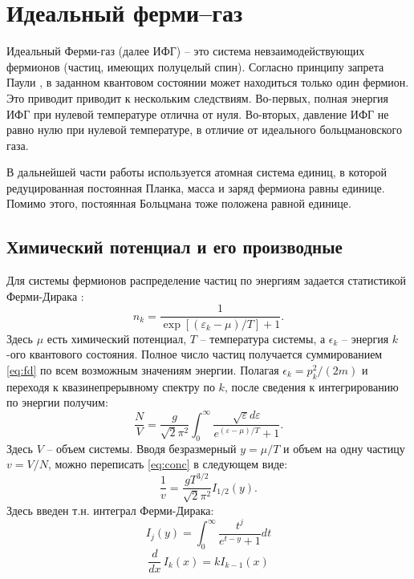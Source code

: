 \chapter{Идеальный ферми--газ}
Идеальный Ферми-газ (далее ИФГ) -- это система невзаимодействующих фермионов (частиц, имеющих полуцелый спин).
Согласно принципу запрета Паули \cite{Pauli:ZP:1925,Pauli:PR:1940}, в заданном квантовом состоянии может находиться только один фермион.
Это приводит приводит к нескольким следствиям.
Во-первых, полная энергия ИФГ при нулевой температуре отлична от нуля.
Во-вторых, давление ИФГ не равно нулю при нулевой температуре, в отличие от идеального больцмановского газа.

В дальнейшей части работы используется атомная система единиц, в которой редуцированная постоянная Планка, масса и заряд фермиона равны единице.
Помимо этого, постоянная Больцмана тоже положена равной единице.

\section{Химический потенциал и его производные}
Для системы фермионов распределение частиц по энергиям задается статистикой Ферми-Дирака \cite{Landau:statmech:1958}:
\begin{equation}
    n_k = \frac{1}{\exp{[(\varepsilon_k - \mu)/T]} + 1}.
    \label{eq:fd}
\end{equation}
Здесь $\mu$ есть химический потенциал, $T$ -- температура системы, а $\epsilon_k$ -- энергия $k$-ого квантового состояния.
Полное число частиц получается суммированием \eqref{eq:fd} по всем возможным значениям энергии.
Полагая $\epsilon_k = p^2_{k} / (2m)$ и переходя к квазинепрерывному спектру по $k$, после сведения к интегрированию по энергии получим:
\begin{equation}
    \label{eq:conc}
    \frac{N}{V}=\frac{g}{\sqrt{2} \pi^{2}} \int_{0}^{\infty} \frac{\sqrt{\varepsilon} d \varepsilon}{e^{(\varepsilon-\mu) / T}+1}.
\end{equation}
Здесь $V$ -- объем системы.
Вводя безразмерный $y = \mu / T$ и объем на одну частицу $v = V / N$, можно переписать \eqref{eq:conc} в следующем виде:
\begin{equation}
    \frac{1}{v} = \frac{g T^{3/2}}{\sqrt{2}\pi^2}I_{1/2}(y).
    \label{eq:mu_equation}
\end{equation}
Здесь введен т.н. интеграл Ферми-Дирака:
\begin{equation}
    \label{eq:fermi-dirak_integral_definition}
    I_{j}(y)= \int_{0}^{\infty} \frac{t^{j}}{e^{t-y}+1} dt
\end{equation}
\begin{equation}
    \label{eq:ifg_diff_rule}
    \frac{d}{dx}\, I_k (x) = k I _{k-1} (x)
\end{equation}

